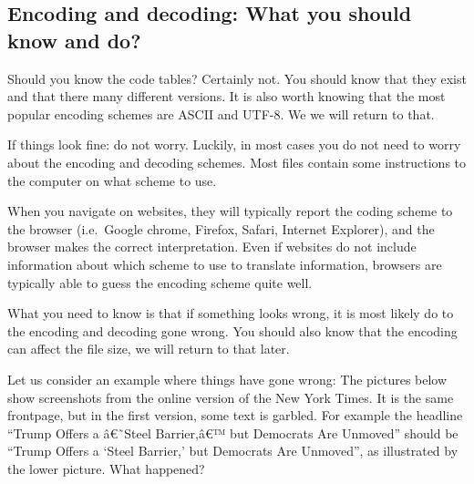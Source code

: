 \documentclass[]{book}
\begin{document}
\hypertarget{encoding-and-decoding-what-you-should-know-and-do}{%
\subsection{Encoding and decoding: What you should know and do?}\label{encoding-and-decoding-what-you-should-know-and-do}}

Should you know the code tables? Certainly not. You should know that they exist and that there many different versions. It is also worth knowing that the most popular encoding schemes are ASCII and UTF-8. We we will return to that.

If things look fine: do not worry. Luckily, in most cases you do not need to worry about the encoding and decoding schemes. Most files contain some instructions to the computer on what scheme to use.

When you navigate on websites, they will typically report the coding scheme to the browser (i.e.~Google chrome, Firefox, Safari, Internet Explorer), and the browser makes the correct interpretation. Even if websites do not include information about which scheme to use to translate information, browsers are typically able to guess the encoding scheme quite well.

What you need to know is that if something looks wrong, it is most likely do to the encoding and decoding gone wrong. You should also know that the encoding can affect the file size, we will return to that later.

Let us consider an example where things have gone wrong: The pictures below show screenshots from the online version of the New York Times. It is the same frontpage, but in the first version, some text is garbled. For example the headline ``Trump Offers a â€˜Steel Barrier,â€™ but Democrats Are Unmoved'' should be ``Trump Offers a `Steel Barrier,' but Democrats Are Unmoved'', as illustrated by the lower picture. What happened?
\end{document}
